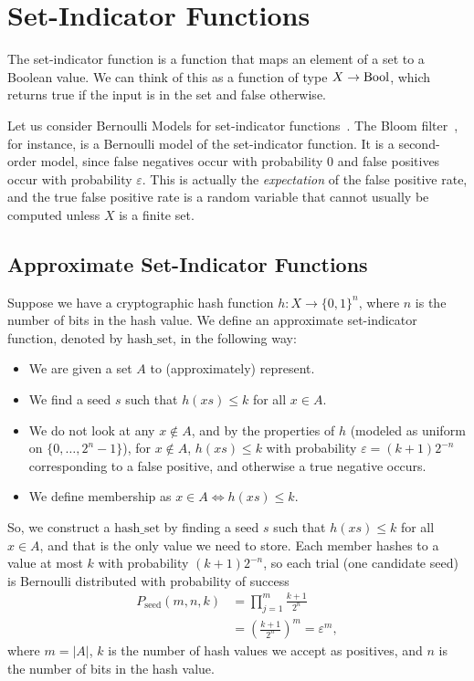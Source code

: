 \documentclass[../main.tex]{subfiles}
\begin{document}
\section{Set-Indicator Functions}

The set-indicator function is a function that maps an element of a set to a Boolean value. We can think of this as a function of type $X \to \mathrm{Bool}$, which returns true if the input is in the set and false otherwise.

Let us consider Bernoulli Models for set-indicator functions~\cite{bernoulliSets}. The Bloom filter~\cite{bloom1970}, for instance, is a Bernoulli model of the set-indicator function. It is a second-order model, since false negatives occur with probability 0 and false positives occur with probability $\varepsilon$. This is actually the \emph{expectation} of the false positive rate, and the true false positive rate is a random variable that cannot usually be computed unless $X$ is a finite set.

\subsection{Approximate Set-Indicator Functions}

Suppose we have a cryptographic hash function $h : X \to \{0,1\}^n$, where $n$ is the number of bits in the hash value. We define an approximate set-indicator function, denoted by $\mathrm{hash\_set}$, in the following way:

\begin{itemize}
\item We are given a set $A$ to (approximately) represent.
\item We find a seed $s$ such that $h(x s) \leq k$ for all $x \in A$.
\item We do not look at any $x \notin A$, and by the properties of $h$ (modeled as uniform on $\{0,\ldots,2^n-1\}$), for $x \notin A$, $h(x s) \leq k$ with probability $\varepsilon = (k+1) 2^{-n}$ corresponding to a false positive, and otherwise a true negative occurs.
\item We define membership as $x \in A \iff h(x s) \leq k$.
\end{itemize}

So, we construct a $\mathrm{hash\_set}$ by finding a seed $s$ such that $h(x s) \leq k$ for all $x \in A$, and that is the only value we need to store. Each member hashes to a value at most $k$ with probability $(k+1) 2^{-n}$, so each trial (one candidate seed) is Bernoulli distributed with probability of success
\begin{align}
    P_{\mathrm{seed}}(m,n,k)
        &= \prod_{j=1}^{m} \frac{k+1}{2^n}\\
        &= \left(\frac{k+1}{2^n}\right)^m = \varepsilon^m,
\end{align}
where $m = |A|$, $k$ is the number of hash values we accept as positives, and $n$ is the number of bits in the hash value.
\end{document}
